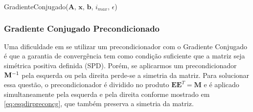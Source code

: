 \vspace{1cm}
\begin{algorithm}[H]
\caption{GradienteConjugado($\mathbf{A}$, $\mathbf{x}$, $\mathbf{b}$, $i_{max}$, $\epsilon$)}
\label{alg:algoritmocg}
\end{algorithm}
\vspace{1cm}


\subsubsection{Gradiente Conjugado Precondicionado}

Uma dificuldade em se utilizar um precondicionador com o Gradiente Conjugado é que a garantia de convergência tem como condição suficiente que a matriz seja simétrica positiva definida (SPD). Porém, se aplicarmos um precondicionador $\mathbf{M}^{-1}$ pela esquerda ou pela direita perde-se a simetria da matriz. Para solucionar essa questão, o precondicionador é dividido no produto $\mathbf{E}\mathbf{E}^T = \mathbf{M}$ e é aplicado simultaneamente pela esquerda e pela direita conforme mostrado em \eqref{eq:esqdirpreconcg}, que também preserva a simetria da matriz.


